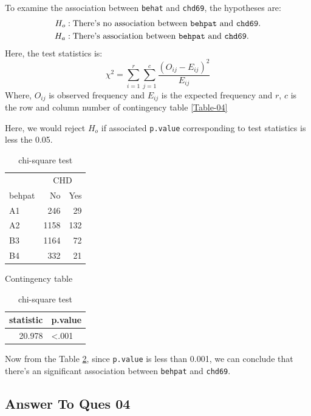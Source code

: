 \documentclass[
  12pt,
  oneside]{article}
\begin{document}
To examine the association between \texttt{behat} and \texttt{chd69}, the hypotheses are:
\begin{align*}
H_o&: \text{There's no association between \texttt{behpat} and \texttt{chd69}.} \\
H_a&: \text{There's association between \texttt{behpat} and \texttt{chd69}.}
\end{align*}
Here, the test statistics is:
\[
\chi^2 = \sum_{i=1}^{r}\sum_{j=1}^{c}\frac{(O_{ij} - E_{ij})^2}{E_{ij}}
\]
Where, \(O_{ij}\) is observed frequency and \(E_{ij}\) is the expected frequency and \(r\), \(c\) is the row and column number of contingency table \ref{Table-04}

Here, we would reject \(H_o\) if associated \texttt{p.value} corresponding to test statistics
is less the 0.05.

\begin{table}[H]
      \begin{minipage}{.5\linewidth}
      \centering
\begin{tabular}{lrr}
\toprule
\multicolumn{1}{c}{ } & \multicolumn{2}{c}{CHD} \\
\cmidrule(l{3pt}r{3pt}){2-3}
behpat & No & Yes\\
\midrule
A1 & 246 & 29\\
A2 & 1158 & 132\\
B3 & 1164 & 72\\
B4 & 332 & 21\\
\bottomrule
\end{tabular}\caption{Contingency table}
      \label{Table-04}
    \end{minipage}%
      \begin{minipage}{.5\linewidth}
        \centering
\begin{tabular}{rl}
\toprule
statistic & p.value\\
\midrule
20.978 & <.001\\
\bottomrule
\end{tabular}\caption{chi-square test}
    \label{Table-05}
    \end{minipage}
      \end{table}

Now from the Table \ref{Table-05}, since \texttt{p.value} is less than 0.001, we can conclude that there's an significant association between \texttt{behpat} and \texttt{chd69}.

\clearpage

\hypertarget{answer-to-ques-04}{%
\subsection{Answer To Ques 04}\label{answer-to-ques-04}}
\end{document}
